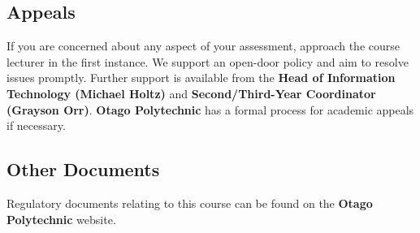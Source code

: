 \documentclass{article}
\begin{document}
\subsection*{Appeals}
If you are concerned about any aspect of your assessment, approach the course lecturer in the first instance. We support an open-door policy and aim to resolve issues promptly. Further support is available from the \textbf{Head of Information Technology (Michael Holtz)} and \textbf{Second/Third-Year Coordinator (Grayson Orr)}. \textbf{Otago Polytechnic} has a formal process for academic appeals if necessary.

\subsection*{Other Documents}
Regulatory documents relating to this course can be found on the \textbf{Otago Polytechnic} website.
\end{document}
